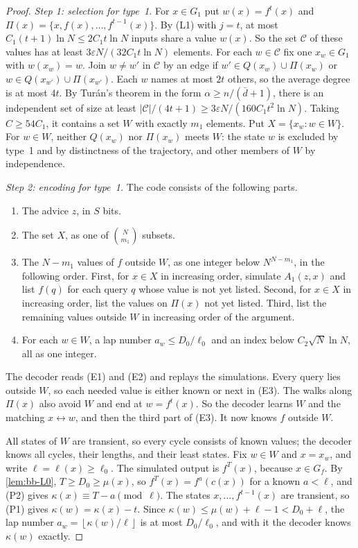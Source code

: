 \documentclass[11pt]{article}
\theoremstyle{definition}
\theoremstyle{remark}
\newcommand{\floor}[1]{\left\lfloor #1\right\rfloor}
\numberwithin{equation}{section}
\begin{document}
\begin{proof}
\emph{Step 1: selection for type~1.}  For $x\in G_1$ put $w(x)=f^t(x)$
and $\Pi(x)=\{x,f(x),\ldots,f^{t-1}(x)\}$.  By (L1) with $j=t$, at most
$C_1(t+1)\ln N\leq2C_1t\ln N$ inputs share a value $w(x)$.  So the set
$\mathcal C$ of these values has at least $3\varepsilon N/(32C_1t\ln N)$
elements.  For each $w\in\mathcal C$ fix one $x_w\in G_1$ with
$w(x_w)=w$.  Join $w\neq w'$ in $\mathcal C$ by an edge if
$w'\in Q(x_w)\cup\Pi(x_w)$ or $w\in Q(x_{w'})\cup\Pi(x_{w'})$.  Each $w$
names at most $2t$ others, so the average degree is at most $4t$.  By
Tur\'an's theorem in the form $\alpha\geq n/(\bar d+1)$, there is an
independent set of size at least
$|\mathcal C|/(4t+1)\geq3\varepsilon N/(160C_1t^2\ln N)$.  Taking
$C\geq54C_1$, it contains a set $W$ with exactly $m_1$ elements.  Put
$X=\{x_w:w\in W\}$.  For $w\in W$, neither $Q(x_w)$ nor $\Pi(x_w)$ meets
$W$: the state $w$ is excluded by type~1 and by distinctness of the
trajectory, and other members of $W$ by independence.

\emph{Step 2: encoding for type~1.}  The code consists of the following
parts.
\begin{enumerate}[label=(E\arabic*)]
\item The advice $z$, in $S$ bits.
\item The set $X$, as one of $\binom N{m_1}$ subsets.
\item The $N-m_1$ values of $f$ outside $W$, as one integer below
  $N^{N-m_1}$, in the following order.  First, for $x\in X$ in increasing
  order, simulate $A_1(z,x)$ and list $f(q)$ for each query $q$ whose value
  is not yet listed.  Second, for $x\in X$ in increasing order, list the
  values on $\Pi(x)$ not yet listed.  Third, list the remaining values
  outside $W$ in increasing order of the argument.
\item For each $w\in W$, a lap number $a_w\leq D_0/\ell_0$ and an index
  below $C_2\sqrt N\ln N$, all as one integer.
\end{enumerate}
The decoder reads (E1) and (E2) and replays the simulations.  Every query
lies outside $W$, so each needed value is either known or next in (E3).
The walks along $\Pi(x)$ also avoid $W$ and end at $w=f^t(x)$.  So the
decoder learns $W$ and the matching $x\leftrightarrow w$, and then the
third part of (E3).  It now knows $f$ outside $W$.

All states of $W$ are transient, so every cycle consists of known values;
the decoder knows all cycles, their lengths, and their least states.  Fix
$w\in W$ and $x=x_w$, and write $\ell=\ell(x)\geq\ell_0$.  The simulated
output is $f^T(x)$, because $x\in G_f$.  By \cref{lem:bb-L0},
$T\geq D_0\geq\mu(x)$, so $f^T(x)=f^a(c(x))$ for a known $a<\ell$, and
(P2) gives $\kappa(x)\equiv T-a\pmod\ell$.  The states
$x,\ldots,f^{t-1}(x)$ are transient, so (P1) gives $\kappa(w)=\kappa(x)-t$.
Since $\kappa(w)\leq\mu(w)+\ell-1<D_0+\ell$, the lap number
$a_w=\floor{\kappa(w)/\ell}$ is at most $D_0/\ell_0$, and with it the
decoder knows $\kappa(w)$ exactly.


\end{proof}
\end{document}
